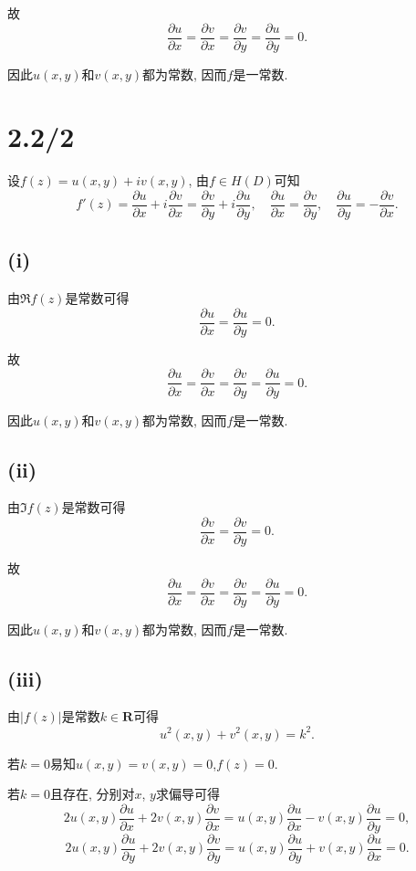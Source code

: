 \documentclass[11pt,a4paper]{article}
\begin{document}
故
$$\frac{\partial u}{\partial x}=\frac{\partial v}{\partial x}=\frac{\partial v}{\partial y}=\frac{\partial u}{\partial y}=0.$$

因此$u(x,y)$和$v(x,y)$都为常数, 因而$f$是一常数.

\section{2.2/2}

设$f(z)=u(x,y)+iv(x,y)$, 由$f\in H(D)$可知
$$f'(z)=\frac{\partial u}{\partial x}+i\frac{\partial v}{\partial x}=\frac{\partial v}{\partial y}+i\frac{\partial u}{\partial y},\quad\frac{\partial u}{\partial x}=\frac{\partial v}{\partial y},\quad\frac{\partial u}{\partial y}=-\frac{\partial v}{\partial x}.$$

\subsection*{(i)}

由$\Re f(z)$是常数可得
$$\frac{\partial u}{\partial x}=\frac{\partial u}{\partial y}=0.$$

故
$$\frac{\partial u}{\partial x}=\frac{\partial v}{\partial x}=\frac{\partial v}{\partial y}=\frac{\partial u}{\partial y}=0.$$

因此$u(x,y)$和$v(x,y)$都为常数, 因而$f$是一常数.

\subsection*{(ii)}

由$\Im f(z)$是常数可得
$$\frac{\partial v}{\partial x}=\frac{\partial v}{\partial y}=0.$$

故
$$\frac{\partial u}{\partial x}=\frac{\partial v}{\partial x}=\frac{\partial v}{\partial y}=\frac{\partial u}{\partial y}=0.$$

因此$u(x,y)$和$v(x,y)$都为常数, 因而$f$是一常数.

\subsection*{(iii)}

由$|f(z)|$是常数$k\in\mathbf{R}$可得
$$u^2(x,y)+v^2(x,y)=k^2.$$

若$k=0$易知$u(x,y)=v(x,y)=0$,$f(z)=0$.

若$k=0$且存在, 分别对$x$, $y$求偏导可得
$$2u(x,y)\frac{\partial u}{\partial x}+2v(x,y)\frac{\partial v}{\partial x}=u(x,y)\frac{\partial u}{\partial x}-v(x,y)\frac{\partial u}{\partial y}=0,$$
$$2u(x,y)\frac{\partial u}{\partial y}+2v(x,y)\frac{\partial v}{\partial y}=u(x,y)\frac{\partial u}{\partial y}+v(x,y)\frac{\partial u}{\partial x}=0.$$
\end{document}

